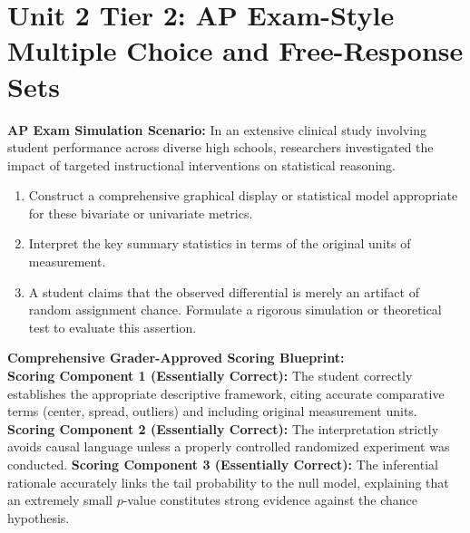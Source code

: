 \section{Unit 2 Tier 2: AP Exam-Style Multiple Choice and Free-Response Sets}
\begin{workbookbox}
\textbf{AP Exam Simulation Scenario:} In an extensive clinical study involving student performance across diverse high schools, researchers investigated the impact of targeted instructional interventions on statistical reasoning.
\begin{enumerate}[label=(\alph*)]
  \item Construct a comprehensive graphical display or statistical model appropriate for these bivariate or univariate metrics.
  \item Interpret the key summary statistics in terms of the original units of measurement.
  \item A student claims that the observed differential is merely an artifact of random assignment chance. Formulate a rigorous simulation or theoretical test to evaluate this assertion.
\end{enumerate}
\textbf{Comprehensive Grader-Approved Scoring Blueprint:}\\
\textbf{Scoring Component 1 (Essentially Correct):} The student correctly establishes the appropriate descriptive framework, citing accurate comparative terms (center, spread, outliers) and including original measurement units.
\textbf{Scoring Component 2 (Essentially Correct):} The interpretation strictly avoids causal language unless a properly controlled randomized experiment was conducted.
\textbf{Scoring Component 3 (Essentially Correct):} The inferential rationale accurately links the tail probability to the null model, explaining that an extremely small $p$-value constitutes strong evidence against the chance hypothesis.
\end{workbookbox}\vspace{6pt}

